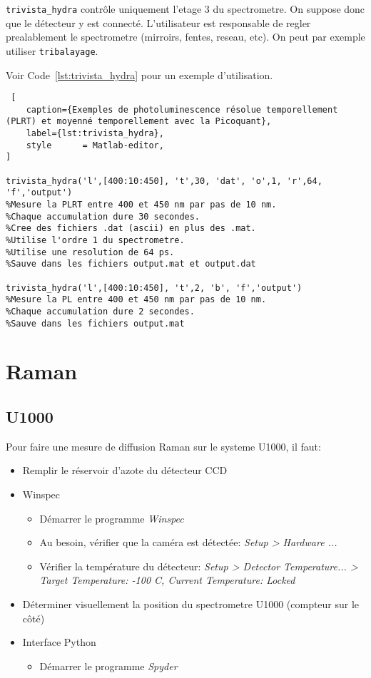 \documentclass[11pt,francais]{book} %
\begin{document}
\lstinline{trivista_hydra} contrôle uniquement l'etage 3 du spectrometre. On suppose donc que le détecteur y est connecté. L'utilisateur est responsable de regler prealablement le spectrometre (mirroirs, fentes, reseau, etc). On peut par exemple utiliser \lstinline{tribalayage}.

Voir Code~\ref{lst:trivista_hydra} pour un exemple d'utilisation.

\begin{lstlisting} [
    caption={Exemples de photoluminescence résolue temporellement (PLRT) et moyenné temporellement avec la Picoquant},
    label={lst:trivista_hydra},
    style      = Matlab-editor,
]

trivista_hydra('l',[400:10:450], 't',30, 'dat', 'o',1, 'r',64, 'f','output') 
%Mesure la PLRT entre 400 et 450 nm par pas de 10 nm.
%Chaque accumulation dure 30 secondes.
%Cree des fichiers .dat (ascii) en plus des .mat.
%Utilise l'ordre 1 du spectrometre.
%Utilise une resolution de 64 ps.
%Sauve dans les fichiers output.mat et output.dat

trivista_hydra('l',[400:10:450], 't',2, 'b', 'f','output') 
%Mesure la PL entre 400 et 450 nm par pas de 10 nm.
%Chaque accumulation dure 2 secondes.
%Sauve dans les fichiers output.mat

\end{lstlisting}


\newpage
\section{Raman}

\subsection{U1000}

Pour faire une mesure de diffusion Raman sur le systeme U1000, il faut:
\begin{itemize}
\item Remplir le réservoir d'azote du détecteur CCD
\item Winspec
	\begin{itemize}
	\item Démarrer le programme \it{Winspec}
	\item Au besoin, vérifier que la caméra est détectée: \it{Setup > Hardware ...}
	\item Vérifier la température du détecteur: \it{Setup > Detector Temperature...} > Target Temperature: -100 C, Current Temperature: Locked
	\end{itemize}
\item Déterminer visuellement la position du spectrometre U1000 (compteur sur le côté)
\item Interface Python
	\begin{itemize}
	\item Démarrer le programme \it{Spyder}
	\end{itemize}
\end{itemize}
\end{document}
